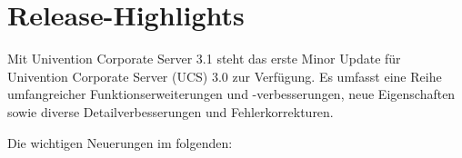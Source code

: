 


\newcommand{\ucsManualTitle}{UCS 3.1 Release Notes}
\newcommand{\ucsManualSubtitle}{Release Notes für die Inbetriebnahme und
Aktualisierung von Univention Corporate Server (UCS) 3.1}
\newcommand{\ucsManualVersion}{3.1}
\newcommand{\ucsTechAuthor}{ & Univention GmbH & feedback@univention.de}

\setcounter{secnumdepth}{3}
\setcounter{tocdepth}{3}



\chapter{Release-Highlights}

Mit Univention Corporate Server 3.1 steht das erste Minor Update für
Univention Corporate Server (UCS) 3.0 zur Verfügung. Es umfasst eine Reihe
umfangreicher Funktionserweiterungen und -verbesserungen, neue
Eigenschaften sowie diverse Detailverbesserungen und Fehlerkorrekturen.

Die wichtigen Neuerungen im folgenden:

